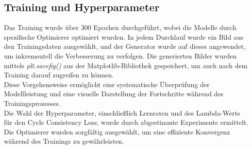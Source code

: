 \subsection{Training und Hyperparameter}
Das Training wurde über 300 Epochen durchgeführt, wobei die Modelle durch spezifische Optimierer optimiert wurden. In jedem Durchlauf wurde ein Bild aus den Trainingsdaten ausgewählt, und der Generator wurde auf dieses angewendet, um inkrementell die Verbesserung zu verfolgen. Die generierten Bilder wurden mittels \textit{plt.savefig()} aus der Matplotlib-Bibliothek gespeichert, um auch nach dem Training darauf zugreifen zu können.\\
Diese Vorgehensweise ermöglicht eine systematische Überprüfung der Modellleistung und eine visuelle Darstellung der Fortschritte während des Trainingsprozesses.
\\
Die Wahl der Hyperparameter, einschließlich Lernraten und des Lambda-Werts für den Cycle Consistency Loss, wurde durch abgestimmte Experimente ermittelt. Die Optimierer wurden sorgfältig ausgewählt, um eine effiziente Konvergenz während des Trainings zu gewährleisten.




